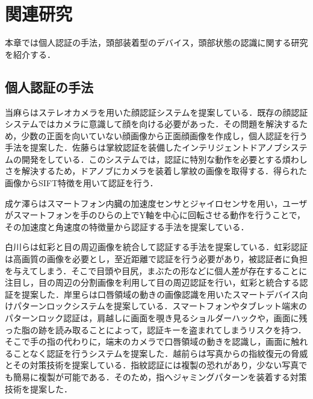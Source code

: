 \documentclass[Japanese,noauthor]{dicomopapers}
\begin{document}
\section{関連研究}
\label{related}
本章では個人認証の手法，頭部装着型のデバイス，頭部状態の認識に関する研究を紹介する．
\subsection{個人認証の手法}
当麻ら\cite{face}はステレオカメラを用いた顔認証システムを提案している．既存の顔認証システムではカメラに意識して顔を向ける必要があった．その問題を解決するため，少数の正面を向いていない顔画像から正面顔画像を作成し，個人認証を行う手法を提案した．佐藤ら\cite{door}は掌紋認証を装備したインテリジェントドアノブシステムの開発をしている．このシステムでは，認証に特別な動作を必要とする煩わしさを解決するため，ドアノブにカメラを装着し掌紋の画像を取得する．得られた画像からSIFT特徴を用いて認証を行う．\par
成ケ澤ら\cite{acceleration}はスマートフォン内臓の加速度センサとジャイロセンサを用い，ユーザがスマートフォンを手のひらの上でY軸を中心に回転させる動作を行うことで，その加速度と角速度の特徴量から認証する手法を提案している．\par
白川ら\cite{iris_eye}は虹彩と目の周辺画像を統合して認証する手法を提案している．虹彩認証は高画質の画像を必要とし，至近距離で認証を行う必要があり，被認証者に負担を与えてしまう．そこで目頭や目尻，まぶたの形などに個人差が存在することに注目し，目の周辺の分割画像を利用して目の周辺認証を行い，虹彩と統合する認証を提案した．岸里ら\cite{mouth_pattern}は口唇領域の動きの画像認識を用いたスマートデバイス向けパターンロックシステムを提案している．スマートフォンやタブレット端末のパターンロック認証は，肩越しに画面を覗き見るショルダーハックや，画面に残った脂の跡を読み取ることによって，認証キーを盗まれてしまうリスクを持つ．そこで手の指の代わりに，端末のカメラで口唇領域の動きを認識し，画面に触れることなく認証を行うシステムを提案した．越前ら\cite{finger_print}は写真からの指紋復元の脅威とその対策技術を提案している．指紋認証には複製の恐れがあり，少ない写真でも簡易に複製が可能である．そのため，指へジャミングパターンを装着する対策技術を提案した．\par
\end{document}
